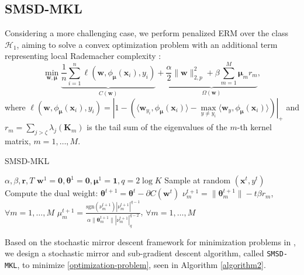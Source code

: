 \documentclass{article}
\begin{document}
\subsection{SMSD-MKL}
Considering a more challenging case,
we perform penalized ERM over the class $\mathcal{H}_{1}$,
aiming to solve a convex optimization problem with an additional term representing local Rademacher complexity :
\begin{equation}
\label{optimization-problem}
    \min_{\mathbf w,\bm \mu}
    \underbrace{\frac{1}{n}\sum_{i=1}^n\ell(\mathbf w,\phi_{\bm \mu}(\mathbf{x}_i), y_i)}_{C(\mathbf w)}
    +\underbrace{\frac{\alpha}{2}\|\mathbf w\|_{2,p}^2
    +\beta\sum_{m=1}^M\mathbf{\mu}_mr_m}_{\Omega(\mathbf w)},
\end{equation}
where
$\ell(\mathbf w,\phi_{\bm \mu}(\mathbf{x}_i), y_i)=
\left|1-\left(\langle\mathbf w_{y_i},
\phi_{\bm \mu}(\mathbf{x}_i)\rangle -\max\limits_{y \not= y_i}\langle\mathbf w_y, \phi_{\bm \mu}(\mathbf{x}_i)\rangle\right)\right|_+$
and
$r_m=\sum_{j>\zeta}\lambda_j(\mathbf{K}_m)$ is the tail sum of the eigenvalues of the $m$-th kernel matrix,  $m=1,\ldots, M$.

\begin{algorithm}[t]
   \caption{SMSD-MKL}
   \label{algorithm2}
    \begin{algorithmic}
        $\alpha, \beta, \bm r, T$
        $\mathbf w^1=\mathbf{0}, \pmb{\theta}^1=\mathbf{0}, \bm \mu^1=\mathbf{1}, q=2\log K $
       \STATE Sample at random $(\mathbf{x}^t, y^t)$
       \STATE Compute the dual weight: $\pmb{\theta}^{t+1}=\pmb{\theta}^t-\partial{C(\mathbf w^t)}$
       \STATE $\nu_m^{t+1}=\|\bm \theta_m^{t+1}\|-t\beta r_m$, $\forall m=1,\ldots, M$
       \STATE $\mu_m^{t+1}=\frac{\mathrm{sgn}(\nu_m^{t+1})|\nu_m^{t+1}|^{q-1}}
       {\alpha\|\bm \theta_m^{t+1}\||\nu_m^{t+1}|_q^{q-2}}$, $\forall m=1,\ldots, M$
       \ENDFOR
    \end{algorithmic}
\end{algorithm}

Based on the stochastic mirror descent framework for minimization problems in \cite{Shalev-ShwartzT11, OrabonaL11},
we design a stochastic mirror and sub-gradient descent algorithm, called \texttt{SMSD-MKL}, to minimize \eqref{optimization-problem},
seen in Algorithm \ref{algorithm2}.
\end{document}
